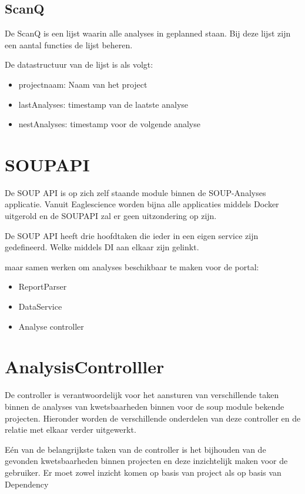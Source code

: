 \subsection{ScanQ}
De ScanQ is een lijst waarin alle analyses in geplanned staan. Bij deze lijst zijn een aantal functies de lijst beheren.

De datastructuur van de lijst is als volgt:
\begin{itemize}
    \item projectnaam: Naam van het project
    \item lastAnalyses: timestamp van de laatste analyse
    \item nestAnalyses: timestamp voor de volgende analyse
\end{itemize}





\section{SOUPAPI}\label{sec:soupapi}
De SOUP API is op zich zelf staande module binnen de SOUP-Analyses applicatie. Vanuit Eaglescience worden bijna alle applicaties middels Docker uitgerold en de SOUPAPI zal er geen uitzondering op zijn.

De SOUP API heeft drie hoofdtaken die ieder in een eigen service zijn gedefineerd. Welke middels DI aan elkaar zijn gelinkt.

maar samen werken om analyses beschikbaar te maken voor de portal:
\begin{itemize}
    \item ReportParser
    \item DataService
    \item Analyse controller
\end{itemize}





\section{AnalysisControlller}\label{sec:Implcontroller}
De controller is verantwoordelijk voor het aansturen van verschillende taken binnen de analyses van kwetsbaarheden binnen voor de soup module bekende projecten. Hieronder worden de verschillende onderdelen van deze controller en de relatie met elkaar verder uitgewerkt.

Eén van de belangrijkste taken van de controller is het bijhouden van de gevonden kwetsbaarheden binnen projecten en deze inzichtelijk maken voor de gebruiker. Er moet zowel inzicht komen op basis van project als op basis van Dependency

